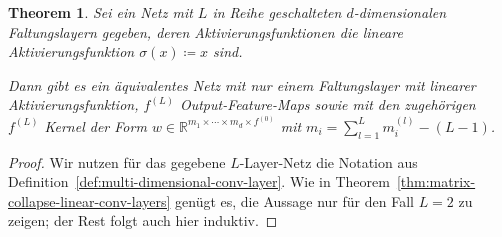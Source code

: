 \documentclass[paper=a4, 	%
		fontsize=11pt, 		%
		abstracton, 	%
		headsepline, 	%
		notitlepage	%
		]{scrartcl}
\newtheorem{theorem}{Theorem}[section]
\theoremstyle{definition}
\newcommand{\R}{\mathbb{R}}
\begin{document}
\begin{theorem}
    Sei ein Netz mit $L$ in Reihe geschalteten $d$-dimensionalen Faltungslayern gegeben, deren Aktivierungsfunktionen die lineare Aktivierungsfunktion $\sigma(x) \coloneqq x$ sind.

    Dann gibt es ein äquivalentes Netz mit nur einem Faltungslayer mit linearer Aktivierungsfunktion, $f^{(L)}$ Output-Feature-Maps sowie mit den zugehörigen $f^{(L)}$ Kernel der Form $w\in\R^{m_1\times\cdots\times m_d \times f^{(0)}}$ mit $m_i=\sum_{l=1}^L m^{(l)}_i - (L-1)$.
\end{theorem}
\begin{proof}
    Wir nutzen für das gegebene $L$-Layer-Netz die Notation aus Definition~\ref{def:multi-dimensional-conv-layer}.
    Wie in Theorem~\ref{thm:matrix-collapse-linear-conv-layers} genügt es, die Aussage nur für den Fall $L=2$ zu zeigen; der Rest folgt auch hier induktiv.


\end{proof}
\end{document}
